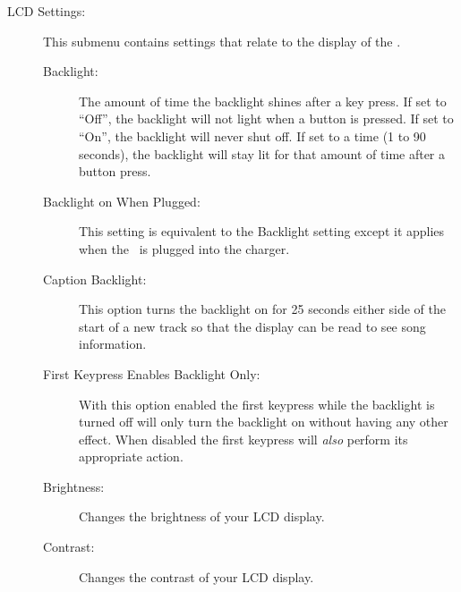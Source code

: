 \begin{description}
  \item[LCD Settings:]
    This submenu contains settings that relate to the display of the \dap.
    \begin{description}
    \item[Backlight:]
    The amount of time the backlight shines after a key press. If set to 
    ``Off'', the backlight will not light when a button is pressed. If 
    set to ``On'', the backlight will never shut off. If set to a time 
    (1 to 90 seconds), the backlight will stay lit for that amount of time 
    after a button press.
    \item[Backlight on When Plugged:]
    This setting is equivalent to the Backlight setting except it applies when
    the \dap\ is plugged into the charger. 
    \item[Caption Backlight:] 
    This option turns the backlight on for 25 seconds either side of the 
    start of a new track so that the display can be read to see song information.
    \item[First Keypress Enables Backlight Only:]
    With this option enabled the first keypress while the backlight is turned 
    off will only turn the backlight on without having any other effect. When
    disabled the first keypress will \emph{also} perform its appropriate action.
    \item[Brightness:]
      Changes the brightness of your LCD display.
    \item[Contrast:] 
    Changes the contrast of your LCD display. 
\end{description}
\end{description}
